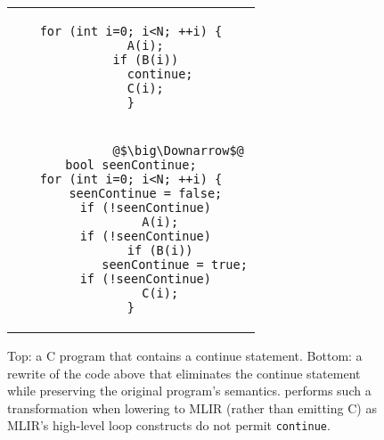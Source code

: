 \begin{figure}
    \centering
\begin{tabular}{c}
\begin{minipage}[t]{0.95\linewidth}
\begin{verbatim}
for (int i=0; i<N; ++i) {
    A(i);
    if (B(i))
        continue;
    C(i);
}
\end{verbatim}
\end{minipage}\\
\begin{minipage}[t]{0.95\linewidth}
\begin{verbatim}
             @$\big\Downarrow$@
bool seenContinue;
for (int i=0; i<N; ++i) {
    seenContinue = false;
    if (!seenContinue)
        A(i);
    if (!seenContinue)
        if (B(i))
            seenContinue = true;
    if (!seenContinue)
        C(i);
}
\end{verbatim}
\end{minipage} 
\end{tabular}
    \caption{Top: a C program that contains a continue statement. Bottom: a rewrite of the code above that eliminates the continue statement while preserving the original program's semantics. \tool performs such a transformation when lowering to MLIR (rather than emitting C) as MLIR's high-level loop constructs do not permit \texttt{continue}.}
    \label{fig:continue}
\end{figure}

